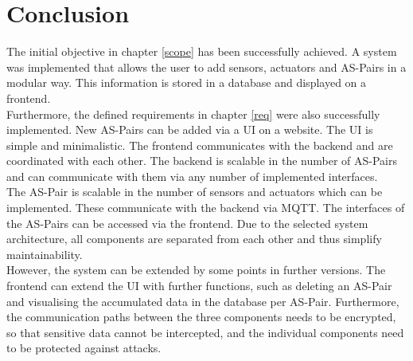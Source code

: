 \section{Conclusion}\label{summary}

The initial objective in chapter \ref{scope} has been successfully achieved. A system was implemented that allows the user to add sensors, actuators and AS-Pairs in a modular way. This information is stored in a database and displayed on a frontend.\\

Furthermore, the defined requirements in chapter \ref{req} were also successfully implemented. New AS-Pairs can be added via a UI on a website. The UI is simple and minimalistic. The frontend communicates with the backend and are coordinated with each other. The backend is scalable in the number of AS-Pairs and can communicate with them via any number of implemented interfaces. \\

The AS-Pair is scalable in the number of sensors and actuators which can be implemented. These communicate with the backend via MQTT. The interfaces of the AS-Pairs can be accessed via the frontend. Due to the selected system architecture, all components are separated from each other and thus simplify maintainability.\\

However, the system can be extended by some points in further versions. The frontend can extend the UI with further functions, such as deleting an AS-Pair and visualising the accumulated data in the database per AS-Pair. Furthermore, the communication paths between the three components needs to be encrypted, so that sensitive data cannot be intercepted, and the individual components need to be protected against attacks.